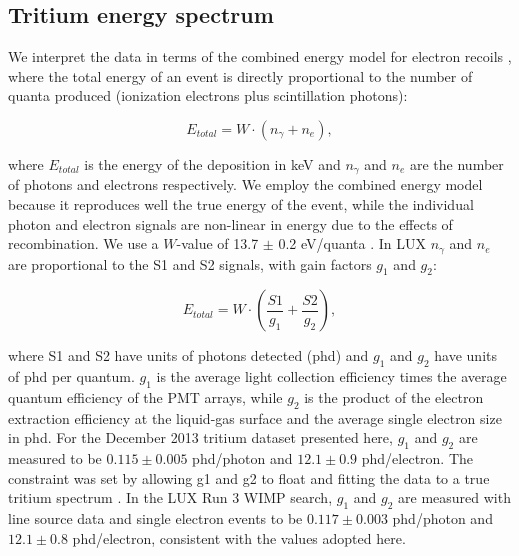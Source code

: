 \subsection{Tritium energy spectrum}

We interpret the data in terms of the combined energy model for electron recoils \cite{Platzman}, where the total energy of an event is directly proportional to the number of quanta produced (ionization electrons plus scintillation photons):

\begin{equation}
E_{total} = W \cdot (n_{\gamma} + n_e ),
\label{platzman_eq}
\end{equation}

\noindent
where $E_{total}$ is the energy of the deposition in keV and  $n_\gamma$ and $n_e$ are the number of photons and electrons respectively. We employ the combined energy model because it reproduces well the true energy of the event, while the individual photon and electron signals are non-linear in energy due to the effects of recombination. We use a $W$-value of 13.7 $\pm$ 0.2 eV/quanta \cite{Dahl_Thesis}. In LUX $n_{\gamma}$ and $n_e$ are proportional to the S1 and S2 signals, with gain factors $g_1$ and $g_2$: 

\begin{equation}
E_{total} = W \cdot \left(\frac{S1}{g_1} + \frac{S2}{g_2} \right),
\label{energy_eq}
\end{equation}

\noindent
where S1 and S2 have units of photons detected (phd) and $g_1$ and $g_2$ have units of phd per quantum. $g_1$ is the average light collection efficiency times the average quantum efficiency of the PMT arrays, while $g_2$ is the product of the electron extraction efficiency at the liquid-gas surface and the average single electron size in phd. For the December 2013 tritium dataset presented here, $g_1$ and $g_2$ are measured to be $0.115 \pm 0.005$ phd/photon and $12.1 \pm 0.9$ phd/electron. The constraint was set by allowing g1 and g2 to float and fitting the data to a true tritium spectrum \cite{Drexlin:2013lha}.  In the LUX Run 3 WIMP search, $g_1$ and $g_2$ are measured with line source data and single electron events to be $0.117 \pm 0.003$ phd/photon and $12.1 \pm 0.8$ phd/electron\cite{lux-reanalysis, lux-prd}, consistent with the values adopted here. 

